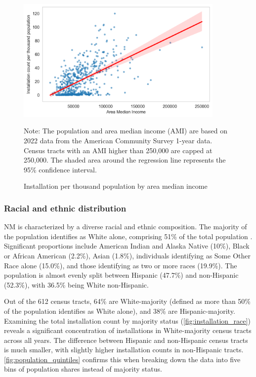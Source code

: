 \documentclass[12pt,twoside,letterpaper]{article}
\begin{document}
\begin{figure}[h]
    \centering
\includegraphics[width=0.9\textwidth]{figures/population_ami_count.png}
    \caption{Installation per thousand population by area median income}
    \label{fig:population_ami_count}
        \begin{flushleft}
        \footnotesize Note: The population and area median income (AMI) are based on 2022 data from the American Community Survey 1-year data. Census tracts with an AMI higher than 250,000 are capped at 250,000. The shaded area around the regression line represents the 95\% confidence interval.
    \end{flushleft}
\end{figure}

\subsubsection{Racial and ethnic distribution}

NM is characterized by a diverse racial and ethnic composition. The majority of the population identifies as White alone, comprising 51\% of the total population \parencite{uscensus2020}. Significant proportions include American Indian and Alaska Native (10\%), Black or African American (2.2\%), Asian (1.8\%), individuals identifying as Some Other Race alone (15.0\%), and those identifying as two or more races (19.9\%). The population is almost evenly split between Hispanic (47.7\%) and non-Hispanic (52.3\%), with 36.5\% being White non-Hispanic.

Out of the 612 census tracts, 64\% are White-majority (defined as more than 50\% of the population identifies as White alone), and 38\% are Hispanic-majority. Examining the total installation count by majority status (\autoref{fig:installation_race}) reveals a significant concentration of installations in White-majority census tracts across all years. The difference between Hispanic and non-Hispanic census tracts is much smaller, with slightly higher installation counts in non-Hispanic tracts. \autoref{fig:population_quintiles} confirms this when breaking down the data into five bins of population shares instead of majority status. 
\end{document}
